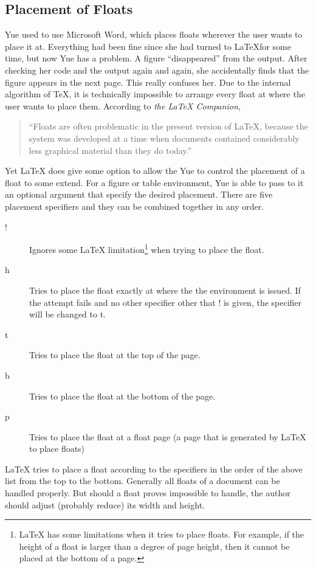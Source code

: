 \subsection{Placement of Floats}
Yue used to use Microsoft Word, which places floats wherever the user wants to place it at. Everything had been fine since she had turned to \LaTeX for some time, but now Yue has a problem. A figure ``disappeared'' from the output. After checking her code and the output again and again, she accidentally finds that the figure appears in the next page. This really confuses her. Due to the internal algorithm of \TeX, it is technically impossible to arrange every float at where the user wants to place them. According to \textit{the \LaTeX{} Companion},
\begin{quotation}
``Floats are often problematic in the present version of \LaTeX, because the system was developed at a time when documents contained considerably less graphical material than they do today.''
\end{quotation}

Yet \LaTeX{} does give some option to allow the Yue to control the placement of a float to some extend. For a figure or table environment, Yue is able to pass to it an optional argument that specify the desired placement. There are five placement specifiers and they can be combined together in any order.
\begin{description}
\item[!] Ignores some \LaTeX{} limitation\footnote{\LaTeX{} has some limitations when it tries to place floats. For example, if the height of a float is larger than a degree of page height, then it cannot be placed at the bottom of a page.} when trying to place the float.
\item[h] Tries to place the float exactly at where the the environment is issued. If the attempt fails and no other specifier other that ! is given, the specifier will be changed to t.
\item[t] Tries to place the float at the top of the page.
\item[b] Tries to place the float at the bottom of the page.
\item[p] Tries to place the float at a float page (a page that is generated by \LaTeX{} to place floats)
\end{description}
\LaTeX{} tries to place a float according to the specifiers in the order of the above list from the top to the bottom. Generally all floats of a document can be handled properly. But should a float proves impossible to handle, the author should adjust (probably reduce) its width and height.

